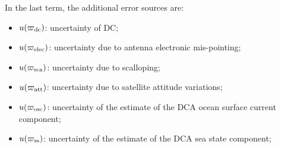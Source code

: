\begin{table}[h]
\begin{tabularx}{\textwidth}{l | X | X | X | X}
			\bottomrule
		\end{tabularx}
        \label{tab: effects JlC}
	\end{table}


In the last term, the additional error sources are:
\begin{itemize}
	\item $u(\varpi_{\rm dc})$: uncertainty of \ac{DC};
	\item $u(\varpi_{\rm elec})$: uncertainty due to antenna electronic mis-pointing;
	\item $u(\varpi_{\rm sca})$: uncertainty due to scalloping;
	\item $u(\varpi_{\rm att})$: uncertainty due to satellite attitude variations;
	\item $u(\varpi_{\rm osc})$: uncertainty of the estimate of the DCA ocean surface current component;
	\item $u(\varpi_{\rm ss})$: uncertainty of the estimate of the DCA sea state component;
\end{itemize}

